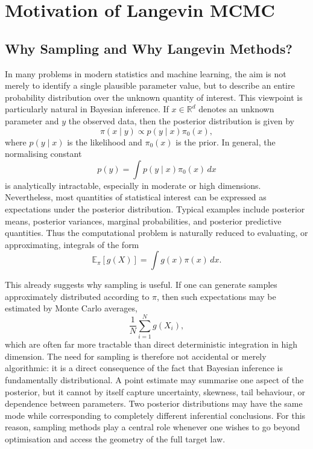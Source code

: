 \documentclass[a4paper,11pt, titlepage]{article}
\theoremstyle{definition}
\theoremstyle{plain}
\theoremstyle{remark}
\begin{document}
\begin{abstract}
Type your abstract here. The abstract is a summary of the contents of the project. It should be brief but informative, and
should avoid technicalities as far as possible.
\end{abstract}
 
\tableofcontents
\clearpage

\section{Motivation of Langevin MCMC}
\label{sec:introduction}

\subsection{Why Sampling and Why Langevin Methods?}

In many problems in modern statistics and machine learning, the aim is not merely to identify a single plausible parameter value, but to describe an entire probability distribution over the unknown quantity of interest. This viewpoint is particularly natural in Bayesian inference. If $x \in \mathbb{R}^d$ denotes an unknown parameter and $y$ the observed data, then the posterior distribution is given by
\[
\pi(x\mid y) \propto p(y\mid x)\pi_0(x),
\]
where $p(y\mid x)$ is the likelihood and $\pi_0(x)$ is the prior. In general, the normalising constant
\[
p(y)=\int p(y\mid x)\pi_0(x)\,dx
\]
is analytically intractable, especially in moderate or high dimensions. Nevertheless, most quantities of statistical interest can be expressed as expectations under the posterior distribution. Typical examples include posterior means, posterior variances, marginal probabilities, and posterior predictive quantities. Thus the computational problem is naturally reduced to evaluating, or approximating, integrals of the form
\[
\mathbb{E}_{\pi}[g(X)] = \int g(x)\pi(x)\,dx.
\]

This already suggests why sampling is useful. If one can generate samples approximately distributed according to $\pi$, then such expectations may be estimated by Monte Carlo averages,
\[
\frac{1}{N}\sum_{i=1}^N g(X_i),
\]
which are often far more tractable than direct deterministic integration in high dimension. The need for sampling is therefore not accidental or merely algorithmic: it is a direct consequence of the fact that Bayesian inference is fundamentally distributional. A point estimate may summarise one aspect of the posterior, but it cannot by itself capture uncertainty, skewness, tail behaviour, or dependence between parameters. Two posterior distributions may have the same mode while corresponding to completely different inferential conclusions. For this reason, sampling methods play a central role whenever one wishes to go beyond optimisation and access the geometry of the full target law.
\end{document}
